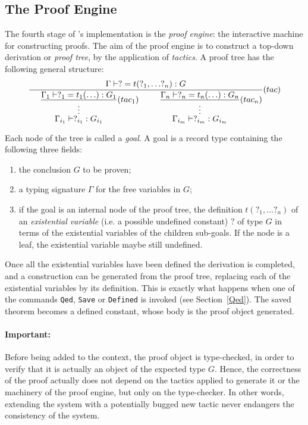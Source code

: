 \subsection{The Proof Engine}

The fourth stage of \Coq's implementation is the \textsl{proof engine}:
the interactive machine for constructing proofs. The aim of the proof
engine is to construct a top-down derivation or \textsl{proof tree},
by the application of \textsl{tactics}. A proof tree has the following
general structure:\\

\begin{displaymath}
\frac{\Gamma \vdash ? = t(?_1,\ldots?_n) : G}
     {\hspace{3ex}\frac{\displaystyle \Gamma_1 \vdash ?_1 = t_1(\ldots) : G_1}
         {\stackrel{\vdots}{\displaystyle {\Gamma_{i_1} \vdash ?_{i_1} 
           : G_{i_1}}}}(tac_1)
      \;\;\;\;\;\;\;\;\;
      \frac{\displaystyle \Gamma_n \vdash ?_n = t_n(\ldots) : G_n}
         {\displaystyle \stackrel{\vdots}{\displaystyle {\Gamma_{i_m} \vdash ?_{i_m} :
     G_{i_m}}}}(tac_n)} (tac)    
\end{displaymath}


\noindent Each node of the tree is called a \textsl{goal}. A goal
is a record type containing the following three fields:
\begin{enumerate}
\item the conclusion $G$ to be proven;
\item a typing signature $\Gamma$ for the free variables in $G$;
\item if the goal is an internal node of the proof tree, the
definition $t(?_1,\ldots?_n)$ of an \textsl{existential variable}
(i.e. a possible undefined constant) $?$ of type $G$ in terms of the
existential variables of the children sub-goals. If the node is a
leaf, the existential variable maybe still undefined.
\end{enumerate}

Once all the existential variables have been defined the derivation is
completed, and a construction can be generated from the proof tree,
replacing each of the existential variables by its definition.  This
is exactly what happens when one of the commands
\texttt{Qed}, \texttt{Save} or \texttt{Defined} is invoked
(see Section~\ref{Qed}). The saved theorem becomes a defined constant,
whose body is the proof object generated.

\paragraph{Important:} Before being added to the
context, the proof object is type-checked, in order to verify that it is
actually an object of the expected type $G$.  Hence, the correctness
of the proof actually does not depend on the tactics applied to
generate it or the machinery of the proof engine, but only on the
type-checker. In other words, extending the system with a potentially
bugged new tactic never endangers the consistency of the system.


